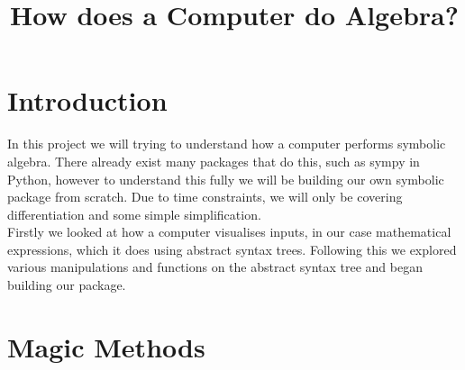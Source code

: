 \documentclass[12pt]{article}
\author{}
\title{\textbf{How does a Computer do Algebra?}}
\date{}
\newcommand\blankpage{
    \null
    \thispagestyle{empty}
    \addtocounter{page}{-1}
    \newpage
    }
\begin{document}
\afterpage{\blankpage}

\maketitle
\newpage

\afterpage{\blankpage}
\tableofcontents



\newpage




\section{Introduction}
In this project we will trying to understand how a computer performs symbolic algebra. There already exist many packages that do this, such as sympy in Python, however to understand this fully we will be building our own symbolic package from scratch. Due to time constraints, we will only be covering differentiation and some simple simplification.\\
Firstly we looked at how a computer visualises inputs, in our case mathematical expressions, which it does using abstract syntax trees. Following this we explored various manipulations and functions on the abstract syntax tree and began building our package.


\section{Magic Methods}
\end{document}
